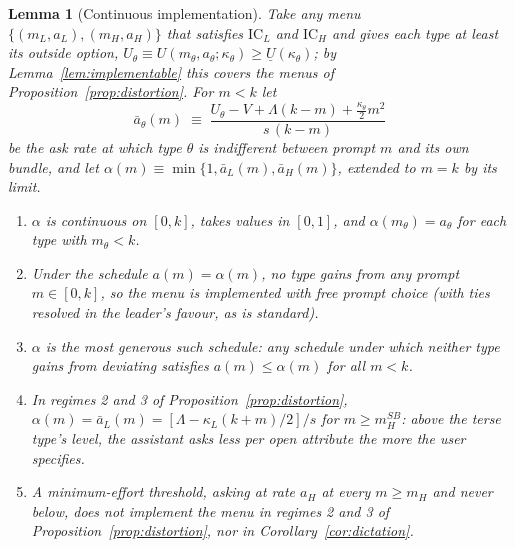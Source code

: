 \documentclass[11pt]{article}
\newtheorem{lemma}{Lemma}
\begin{document}
\begin{lemma}[Continuous implementation]
\label{lem:continuous}
Take any menu $\{(m_L,a_L),(m_H,a_H)\}$ that satisfies $\text{IC}_L$ and $\text{IC}_H$ and gives each type at least its outside option, $U_\theta \equiv U(m_\theta,a_\theta;\kappa_\theta) \ge \underline{U}(\kappa_\theta)$; by Lemma~\ref{lem:implementable} this covers the menus of Proposition~\ref{prop:distortion}. For $m < k$ let
\[
\bar a_\theta(m) \;\equiv\; \frac{U_\theta - V + \Lambda(k-m) + \frac{\kappa_\theta}{2}m^2}{s\,(k-m)}
\]
be the ask rate at which type $\theta$ is indifferent between prompt $m$ and its own bundle, and let $\alpha(m) \equiv \min\{1, \bar a_L(m), \bar a_H(m)\}$, extended to $m = k$ by its limit.
\begin{enumerate}[label=(\roman*)]
\item $\alpha$ is continuous on $[0,k]$, takes values in $[0,1]$, and $\alpha(m_\theta) = a_\theta$ for each type with $m_\theta < k$.
\item Under the schedule $a(m) = \alpha(m)$, no type gains from any prompt $m \in [0,k]$, so the menu is implemented with free prompt choice (with ties resolved in the leader's favour, as is standard).
\item $\alpha$ is the most generous such schedule: any schedule under which neither type gains from deviating satisfies $a(m) \le \alpha(m)$ for all $m < k$.
\item In regimes 2 and 3 of Proposition~\ref{prop:distortion}, $\alpha(m) = \bar a_L(m) = [\Lambda - \kappa_L(k+m)/2]/s$ for $m \ge m_H^{SB}$: above the terse type's level, the assistant asks less per open attribute the more the user specifies.
\item A minimum-effort threshold, asking at rate $a_H$ at every $m \ge m_H$ and never below, does not implement the menu in regimes 2 and 3 of Proposition~\ref{prop:distortion}, nor in Corollary~\ref{cor:dictation}.
\end{enumerate}
\end{lemma}
\end{document}
